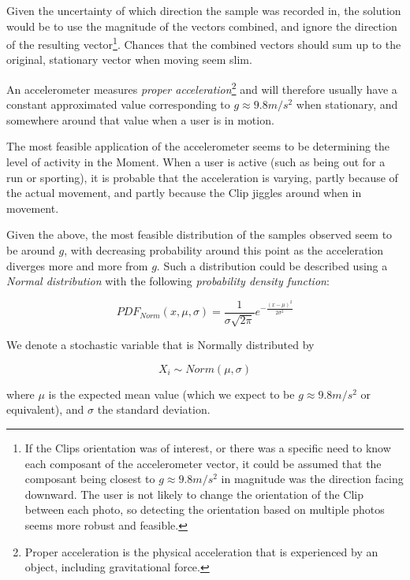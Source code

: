 Given the uncertainty of which direction the sample was recorded in, the
solution would be to use the magnitude of the vectors combined, and 
ignore the direction of the resulting vector\footnote{
    If the Clips orientation was of interest, or there was a specific need
    to know each composant of the accelerometer vector, it could be assumed
    that the composant being closest to $ g \approx 9.8 m/s^2 $ in magnitude was 
    the direction facing downward. The user is not likely to change the 
    orientation of the Clip between each photo, so detecting the orientation
    based on multiple photos seems more robust and feasible. 
}. Chances that the combined
vectors should sum up to the original, stationary vector when moving seem
slim. 

An accelerometer measures \emph{proper acceleration}\footnote{
    Proper acceleration is the physical acceleration that is experienced 
    by an object, including gravitational force. }
and will therefore usually have a constant approximated value corresponding 
to $ g \approx 9.8 m/s^2 $ when stationary, and somewhere around that value when
a user is in motion. 

The most feasible application of the accelerometer seems to be determining
the level of activity in the Moment. When a user is active (such as being
out for a run or sporting), it is probable that the acceleration is varying, 
partly because of the actual movement, and partly because the Clip jiggles 
around when in movement. 

Given the above, the most feasible distribution of the samples observed
seem to be around $g$, with decreasing probability around this point as
the acceleration diverges more and more from $g$. Such a distribution
could be described using a 
\emph{Normal distribution} with the following \emph{probability density 
function}:
\begin{definition}
\label{definition:normal-pdf}
$$
    PDF_{Norm}(x, \mu, \sigma) = 
        \frac{1}{\sigma \sqrt{2\pi} } 
                 e^{ -\frac{(x-\mu)^2}{2\sigma^2} }
$$
\end{definition}

We denote a stochastic variable that is Normally distributed by
\begin{definition}
\label{definition:normal-variable}
$$
    X_i \sim Norm(\mu, \sigma)
$$
\end{definition}
where $\mu$ is the expected mean value (which we expect to be $g \approx 9.8 m/s^2$
or equivalent), and $\sigma$ the standard deviation.


